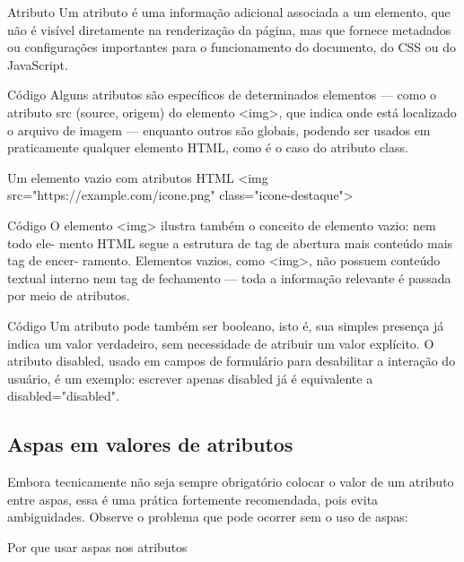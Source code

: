 \begin{infobox}{Atributo}
Um atributo é uma informação adicional associada a um elemento, que não é visível diretamente na renderização da página, mas que fornece metadados ou configurações importantes para o funcionamento do documento, do CSS ou do JavaScript.
\end{infobox}

\begin{codebox}{Código}
Alguns atributos são específicos de determinados elementos — como o atributo
src (source, origem) do elemento <img>, que indica onde está localizado o arquivo
de imagem — enquanto outros são globais, podendo ser usados em praticamente
qualquer elemento HTML, como é o caso do atributo class.
\end{codebox}

\begin{codebox}{Um elemento vazio com atributos}
HTML
<img src="https://example.com/icone.png" class="icone-destaque">
\end{codebox}

\begin{codebox}{Código}
O elemento <img> ilustra também o conceito de elemento vazio: nem todo ele-
mento HTML segue a estrutura de tag de abertura mais conteúdo mais tag de encer-
ramento. Elementos vazios, como <img>, não possuem conteúdo textual interno nem
tag de fechamento — toda a informação relevante é passada por meio de atributos.
\end{codebox}

\begin{codebox}{Código}
Um atributo pode também ser booleano, isto é, sua simples presença já indica um
valor verdadeiro, sem necessidade de atribuir um valor explícito. O atributo disabled,
usado em campos de formulário para desabilitar a interação do usuário, é um exemplo:
escrever apenas disabled já é equivalente a disabled="disabled".
\end{codebox}

\subsection{Aspas em valores de atributos}

Embora tecnicamente não seja sempre obrigatório colocar o valor de um atributo entre aspas, essa é uma prática fortemente recomendada, pois evita ambiguidades. Observe o problema que pode ocorrer sem o uso de aspas:

Por que usar aspas nos atributos

